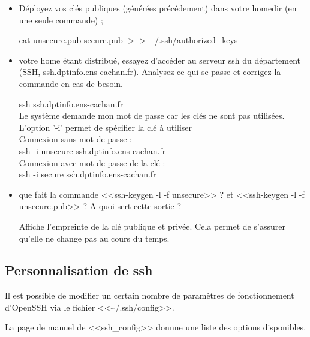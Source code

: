 \documentclass[11pt]{article}
\begin{document}
\begin{itemize}
 \item Déployez vos clés publiques (générées précédement) dans votre homedir (en une seule commande) ;
\begin{solution}

cat unsecure.pub secure.pub $>>$ ~/.ssh/authorized\_keys
\end{solution}
 \item votre home étant distribué, essayez d'accéder au serveur ssh du département (SSH, ssh.dptinfo.ens-cachan.fr). Analysez ce qui se passe et corrigez la commande en cas de besoin.
\begin{solution}

ssh ssh.dptinfo.ens-cachan.fr\\

Le système demande mon mot de passe car les clés ne sont pas utilisées. L'option '-i' permet de spécifier la clé à utiliser\\

Connexion sans mot de passe :\\
ssh -i unsecure ssh.dptinfo.ens-cachan.fr\\

Connexion avec mot de passe de la clé :\\
ssh -i secure ssh.dptinfo.ens-cachan.fr

\end{solution}

 \item que fait la commande <<ssh-keygen -l -f unsecure>> ? et <<ssh-keygen -l -f unsecure.pub>> ? A quoi sert cette sortie ?

\begin{solution}

Affiche l'empreinte de la clé publique et privée. Cela permet de s'assurer qu'elle ne change pas au cours du temps.
\end{solution}
\end{itemize}

\subsection{Personnalisation de ssh}

Il est possible de modifier un certain nombre de paramètres de fonctionnement d'OpenSSH via le fichier <<\textasciitilde{}/.ssh/config>>.

La page de manuel de <<ssh\_config>> donnne une liste des options disponibles.
\end{document}
